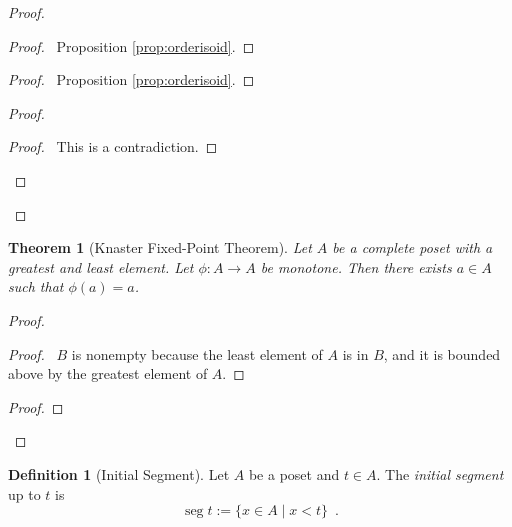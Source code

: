 \documentclass{book}
\let\qed\relax
\newtheorem{thm}[ax]{Theorem}
\theoremstyle{definition}
\newtheorem{df}[ax]{Definition}
\newcommand{\seg}{\ensuremath{\operatorname{seg}}}
\begin{document}
\begin{proof}
\begin{proof}
	\pf\ Proposition \ref{prop:orderisoid}.
\end{proof}
\begin{proof}
	\pf\ Proposition \ref{prop:orderisoid}.
\end{proof}
\begin{proof}
	\qedstep
	\begin{proof}
		\pf\ This is a contradiction.
	\end{proof}
\end{proof}
\qed
\end{proof}

\begin{thm}[Knaster Fixed-Point Theorem]
Let $A$ be a complete poset with a greatest and least element. Let $\phi : A \rightarrow A$ be monotone. Then there exists $a \in A$ such that $\phi(a) = a$.
\end{thm}

\begin{proof}
\pf
{}
\begin{proof}
	\pf\ $B$ is nonempty because the least element of $A$ is in $B$, and it is bounded above by the greatest element of $A$.
\end{proof}
\begin{proof}
\end{proof}
\qed
\end{proof}

\begin{df}[Initial Segment]
Let $A$ be a poset and $t \in A$. The \emph{initial segment} up to $t$ is
\[ \seg t := \{ x \in A \mid x < t \} \enspace . \]
\end{df}
\end{document}
